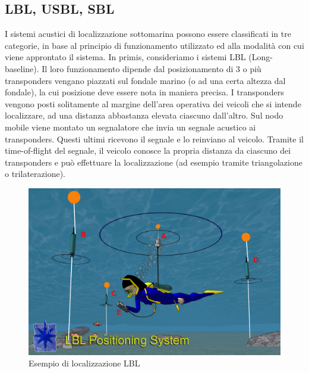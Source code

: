 \documentclass[Lau,binding=0.6cm]{sapthesis}
\begin{document}
\subsection{LBL, USBL, SBL}
I sistemi acustici di localizzazione sottomarina possono essere classificati in tre categorie, in base al principio di funzionamento utilizzato ed alla modalità con cui viene approntato il sistema. \cite{underwaterpositioning} \newline
In primis, consideriamo i sistemi LBL (Long-baseline).  Il loro funzionamento dipende dal posizionamento di 3 o più transponders vengano piazzati sul fondale marino (o ad una certa altezza dal fondale), la cui posizione deve essere nota in maniera precisa. 
I transponders vengono posti solitamente al margine dell'area operativa dei veicoli che si intende localizzare, ad una distanza abbastanza elevata ciascuno dall'altro. Sul nodo mobile viene montato un segnalatore che invia un segnale acustico ai transponders. Questi ultimi ricevono il segnale e lo reinviano al veicolo. Tramite il time-of-flight del segnale, il veicolo conosce la propria distanza da ciascuno dei transponders e può effettuare la localizzazione (ad esempio tramite triangolazione o trilaterazione).

\begin{figure}[H]
    \centering
	\includegraphics[scale=0.25]{LBL.jpg}
	\caption{ Esempio di localizzazione LBL}
	\label{fig:LBL}
\end{figure}
\newpage
\end{document}
